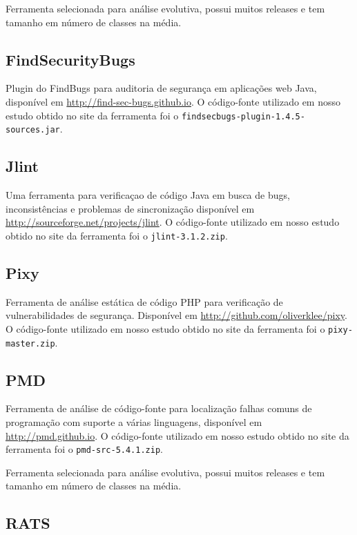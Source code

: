 Ferramenta selecionada para análise evolutiva, possui muitos releases e tem tamanho
em número de classes na média.

\subsection{FindSecurityBugs}

Plugin do FindBugs para auditoria de segurança em aplicações web Java,
disponível em \url{http://find-sec-bugs.github.io}. O código-fonte utilizado
em nosso estudo obtido no site da ferramenta foi o
\texttt{findsecbugs-plugin-1.4.5-sources.jar}.

\subsection{Jlint}

Uma ferramenta para verificaçao de código Java em busca de bugs,
inconsistências e problemas de sincronização disponível em
\url{http://sourceforge.net/projects/jlint}.  O código-fonte utilizado em
nosso estudo obtido no site da ferramenta foi o \texttt{jlint-3.1.2.zip}.

\subsection{Pixy}

Ferramenta de análise estática de código PHP para verificação de
vulnerabilidades de segurança. Disponível em
\url{http://github.com/oliverklee/pixy}. O código-fonte utilizado em nosso
estudo obtido no site da ferramenta foi o \texttt{pixy-master.zip}.

\subsection{PMD}

Ferramenta de análise de código-fonte para localização falhas comuns de
programação com suporte a várias linguagens, disponível em
\url{http://pmd.github.io}. O código-fonte utilizado em nosso estudo obtido
no site da ferramenta foi o \texttt{pmd-src-5.4.1.zip}.

Ferramenta selecionada para análise evolutiva, possui muitos releases e tem tamanho
em número de classes na média.

\subsection{RATS}

